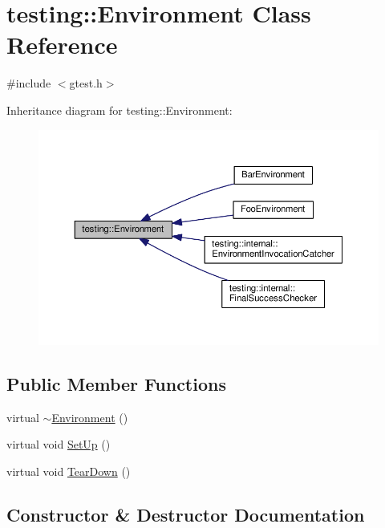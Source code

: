 \hypertarget{classtesting_1_1Environment}{}\section{testing\+:\+:Environment Class Reference}
\label{classtesting_1_1Environment}


{\ttfamily \#include $<$gtest.\+h$>$}



Inheritance diagram for testing\+:\+:Environment\+:\nopagebreak
\begin{figure}[H]
\begin{center}
\leavevmode
\includegraphics[width=350pt]{classtesting_1_1Environment__inherit__graph}
\end{center}
\end{figure}
\subsection*{Public Member Functions}
\begin{DoxyCompactItemize}
\item 
virtual \hyperlink{classtesting_1_1Environment_a0e41c320362576d752cd1f44cabd57d4}{$\sim$\+Environment} ()
\item 
virtual void \hyperlink{classtesting_1_1Environment_a1bf8cafaa9d4eba9feb98655ee434eb3}{Set\+Up} ()
\item 
virtual void \hyperlink{classtesting_1_1Environment_a039bdaa705c46b9b88234cf4d3bb6254}{Tear\+Down} ()
\end{DoxyCompactItemize}


\subsection{Constructor \& Destructor Documentation}
